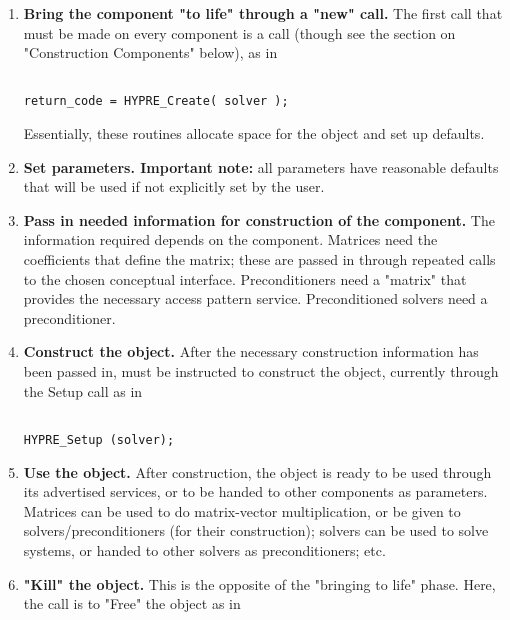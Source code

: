 \begin{enumerate}
\item
{\bf Bring the component "to life" through a "new" call.} The first call that must
be made on every 
\hypre{} component is a  call (though see the section on "Construction
Components" below), as 
in 

\begin{display}
\begin{verbatim}

return_code = HYPRE_Create( solver );

\end{verbatim}
\end{display}

Essentially, these routines allocate
space for the object and 
set up defaults.

\item
{\bf Set parameters.  Important note:} all parameters have reasonable defaults
that will be used if not 
explicitly set by the user.

\item
{\bf Pass in needed information for construction of the component.} The
information required depends 
on the component. Matrices need the coefficients that define the matrix; these
are passed in through 
repeated calls to the chosen conceptual interface. Preconditioners need a
"matrix" that provides the 
necessary access pattern service. Preconditioned solvers need a preconditioner.

\item
{\bf Construct the object.} After the necessary construction information has been
passed in, \hypre{} must 
be instructed to construct the object, currently through the Setup call as in

\begin{display}
\begin{verbatim}

HYPRE_Setup (solver);

\end{verbatim}
\end{display}

\item
{\bf Use the object.} After construction, the object is ready to be used through
its advertised services, or to 
be handed to other components as parameters. Matrices can be used to do
matrix-vector multiplication, 
or be given to solvers/preconditioners (for their construction); solvers can be
used to solve systems, or 
handed to other solvers as preconditioners; etc.

\item
{\bf "Kill" the object.} This is the opposite of the "bringing to life" phase.
Here, the call is to "Free" the 
object as in 


\end{enumerate}
